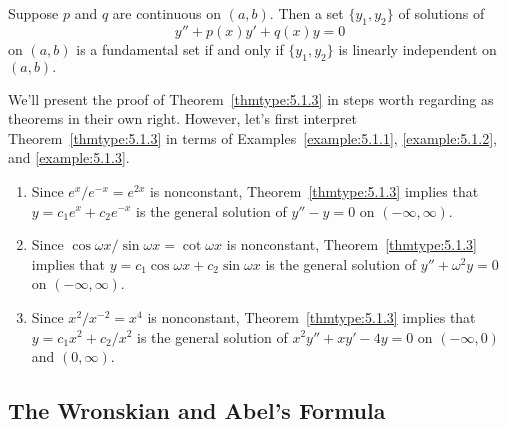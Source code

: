 \documentclass{ximera}
\begin{document}
 \begin{theorem}\label{thmtype:5.1.3}
Suppose $p$ and $q$ are continuous on $(a,b).$ Then a set
$\{y_1,y_2\}$ of solutions of
\begin{equation}\label{eq:5.1.20}
y''+p(x)y'+q(x)y=0
\end{equation}
on $(a,b)$ is a fundamental set if and only if $\{y_1,y_2\}$ is
linearly independent on $(a,b).$
\end{theorem}
 
We'll present the proof of Theorem~\ref{thmtype:5.1.3} in steps worth
regarding as theorems in their own right. However, let's first
interpret Theorem~\ref{thmtype:5.1.3} in terms of
Examples~\ref{example:5.1.1}, \ref{example:5.1.2}, and \ref{example:5.1.3}.
 
\begin{example}\label{example:5.1.4}  
\begin{enumerate}
\item\label{item:5.1.4a}%
Since $e^x/e^{-x}=e^{2x}$ is nonconstant, Theorem~\ref{thmtype:5.1.3}
implies that $y=c_1e^x+c_2e^{-x}$ is the general solution of $y''-y=0$
on $(-\infty,\infty)$.
\item\label{item:5.1.4b}%
Since $\cos\omega x/\sin\omega x=\cot\omega x$ is nonconstant,
Theorem~\ref{thmtype:5.1.3} implies that
 $y=c_1\cos\omega x+c_2\sin\omega x$ is the general solution
of $y''+\omega^2y=0$ on $(-\infty,\infty)$.
\item\label{item:5.1.4c} %
Since $x^2/x^{-2}=x^4$ is nonconstant,
Theorem~\ref{thmtype:5.1.3} implies that
 $y=c_1x^2+c_2/x^2$ is the general
solution of $x^2y''+xy'-4y=0$ on $(-\infty,0)$ and $(0,\infty)$.
\end{enumerate}
\end{example}
 
 
\subsection*{The Wronskian and Abel's Formula}
 
\end{document}
